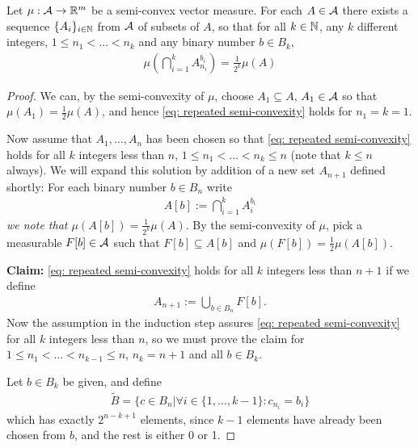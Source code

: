 \begin{lemma} \label{sequence of sets with half the measure}
Let $\mu:\mathcal{A} \to \mathbb{R}^{m}$ be a semi-convex vector measure. For each $A\in \mathcal{A}$ there exists a sequence $\{A_{i}\}_{i\in \mathbb{N}}$ from $\mathcal{A}$ of subsets of $A$, so that for all $k\in \mathbb{N}$, any $k$ different integers, $1 \le n_{1} < \dots < n_{k}$ and any binary number $b\in B_{k}$,
\begin{align}
	\mu\left( \bigcap_{i=1}^{k} A_{n_{i}}^{b_{i}} \right) = \frac{1}{2^{k}} \mu(A) \label{eq: repeated semi-convexity}
\end{align}
\end{lemma}
\begin{proof}
 We can, by the semi-convexity of $\mu$, choose $A_{1}\subseteq A$, $A_{1}\in \mathcal{A}$ so that $\mu(A_{1})=\frac{1}{2}\mu(A)$, and hence \eqref{eq: repeated semi-convexity} holds for $n_{1}=k=1$.

Now assume that $A_{1}, \dots, A_{n}$ has been chosen so that \eqref{eq: repeated semi-convexity} holds for all $k$ integers less than $n$, $1\le n_{1} < \dots < n_{k}\le n$ (note that $k \le n$ always). We will expand this solution by addition of a new set $A_{n+1}$ defined shortly: For each binary number $b\in B_{n}$ write
\begin{align*}
	A[b] := \bigcap_{i=1}^{k} A_{i}^{b_{i}}
\end{align*}
\emph{we note that $\mu(A[b])=\frac{1}{2^{k}}\mu(A)$}.
By the semi-convexity of $\mu$, pick a measurable $F[b]\in \mathcal{A}$ such that $F[b] \subseteq A[b]$ and $\mu(F[b])=\frac{1}{2}\mu(A[b])$.

\textbf{Claim:} \eqref{eq: repeated semi-convexity} holds for all $k$ integers less than $n+1$ if we define
\begin{align}
	A_{n+1}:=\bigcup_{b\in B_{n}} F[b]. \label{eq: A n plus one}
\end{align}
Now the assumption in the induction step assures \eqref{eq: repeated semi-convexity} for all $k$ integers less than $n$, so we must prove the claim for $1\le n_{1} < \dots < n_{k-1} \le n$, $n_{k}=n+1$ and all $b\in B_{k}$.

Let $b\in B_{k}$ be given, and define
\begin{align*}
	\tilde{B}=\{c \in B_{n} | \forall i \in \{ 1, \dots, k-1 \} : c_{n_{i}} = b_{i}  \}
\end{align*}
which has exactly $2^{n-k+1}$ elements, since $k-1$ elements have already been chosen from $b$, and the rest is either 0 or 1.


\end{proof}
